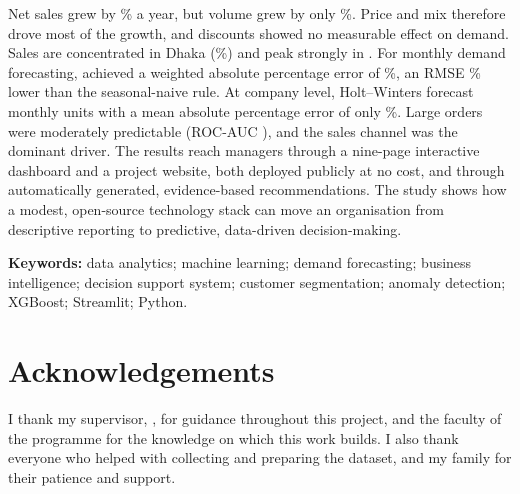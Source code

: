 Net sales grew by \CAGRSales\% a year, but volume grew by only \CAGRUnits\%. Price and mix therefore drove
most of the growth, and discounts showed no measurable effect on demand. Sales are concentrated in Dhaka
(\DhakaShare\%) and peak strongly in \PeakMonth. For monthly demand forecasting, \BestReg achieved a weighted
absolute percentage error of \BestRegWAPE\%, an RMSE \GainVsSNaive\% lower than the seasonal-naive rule. At
company level, Holt--Winters forecast monthly units with a mean absolute percentage error of only \HWMAPE\%.
Large orders were moderately predictable (ROC-AUC \ClsAUC), and the sales channel was the dominant driver. The
results reach managers through a nine-page interactive dashboard and a project website, both deployed publicly
at no cost, and through automatically generated, evidence-based recommendations. The study shows how a modest, open-source technology stack can move an organisation from
descriptive reporting to predictive, data-driven decision-making.

\vspace{4mm}
\noindent\textbf{Keywords:} data analytics; machine learning; demand forecasting; business intelligence;
decision support system; customer segmentation; anomaly detection; XGBoost; Streamlit; Python.

\chapter*{Acknowledgements}
I thank my supervisor, \Supervisor, for guidance throughout this project, and the faculty of the \Programme{}
programme for the knowledge on which this work builds. I also thank everyone who helped with collecting and
preparing the dataset, and my family for their patience and support.
